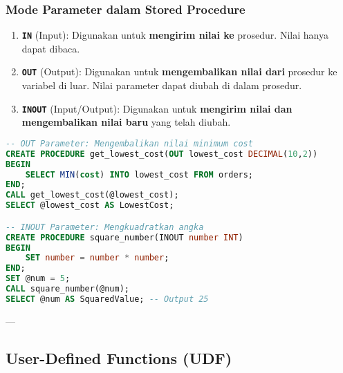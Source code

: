 \documentclass{article}
\begin{document}
\subsubsection{Mode Parameter dalam Stored Procedure}
\begin{enumerate}
    \item \textbf{\texttt{IN}} (Input): Digunakan untuk \textbf{mengirim nilai ke} prosedur. Nilai hanya dapat dibaca.
    \item \textbf{\texttt{OUT}} (Output): Digunakan untuk \textbf{mengembalikan nilai dari} prosedur ke variabel di luar. Nilai parameter dapat diubah di dalam prosedur.
    \item \textbf{\texttt{INOUT}} (Input/Output): Digunakan untuk \textbf{mengirim nilai dan mengembalikan nilai baru} yang telah diubah.
\end{enumerate}
\begin{lstlisting}[language=SQL, caption={Contoh Parameter OUT dan INOUT}, captionpos=b]
-- OUT Parameter: Mengembalikan nilai minimum cost
CREATE PROCEDURE get_lowest_cost(OUT lowest_cost DECIMAL(10,2))  
BEGIN  
	SELECT MIN(cost) INTO lowest_cost FROM orders; 
END;
CALL get_lowest_cost(@lowest_cost);
SELECT @lowest_cost AS LowestCost;

-- INOUT Parameter: Mengkuadratkan angka
CREATE PROCEDURE square_number(INOUT number INT)  
BEGIN  
	SET number = number * number;
END;
SET @num = 5;  
CALL square_number(@num);  
SELECT @num AS SquaredValue; -- Output 25
\end{lstlisting}

---

\subsection{User-Defined Functions (UDF)}
\end{document}
